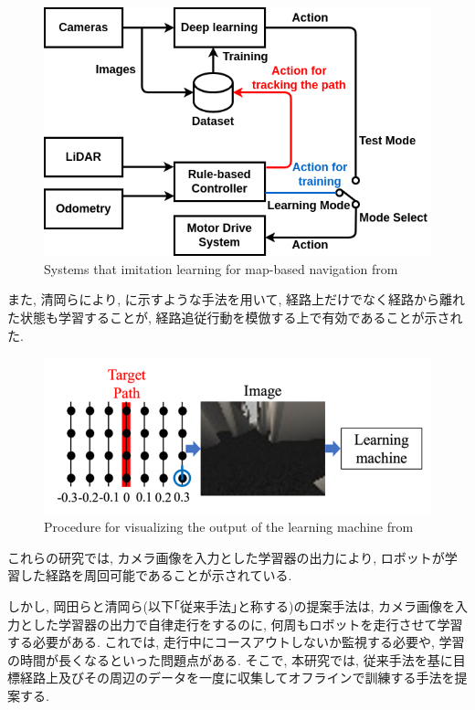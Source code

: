 \begin{figure}[h]
     \centering
     \includegraphics[keepaspectratio, scale=0.42]
     {images/okada-si2020.png}
     \caption{Systems that imitation learning for map-based navigation from \cite{okada-si2020}}
     \label{Fig:okada-si2020}
     \end{figure}

\newpage
また, 清岡ら\cite{kiyooka-si}により, に示すような手法を用いて, 経路上だけでなく経路から離れた状態も学習することが, 経路追従行動を模倣する上で有効であることが示された. 

\vspace{10mm}

\begin{figure}[h]
     \centering
     \includegraphics[keepaspectratio, scale=0.45]{images/kiyooka-si-1.png}
     \caption{Procedure for visualizing the output of the learning machine from \cite{kiyooka-si}}
     \label{Fig:kiyooka-si}
     \end{figure}

\vspace{20mm}
これらの研究では, カメラ画像を入力とした学習器の出力により, ロボットが学習した経路を周回可能であることが示されている. \par しかし, 岡田らと清岡ら(以下｢従来手法｣と称する)の提案手法は, カメラ画像を入力とした学習器の出力で自律走行をするのに, 何周もロボットを走行させて学習する必要がある. これでは, 走行中にコースアウトしないか監視する必要や, 学習の時間が長くなるといった問題点がある. そこで, 本研究では, 従来手法を基に目標経路上及びその周辺のデータを一度に収集してオフラインで訓練する手法を提案する. 

